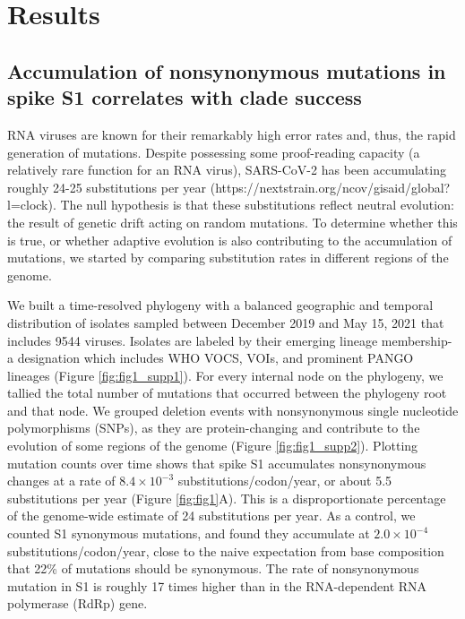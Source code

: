 \documentclass[11pt,oneside,letterpaper]{article}
\begin{document}
\section*{Results}
\subsection*{Accumulation of nonsynonymous mutations in spike S1 correlates with clade success}
RNA viruses are known for their remarkably high error rates and, thus, the rapid generation of mutations. Despite possessing some proof-reading capacity (a relatively rare function for an RNA virus), SARS-CoV-2 has been accumulating roughly 24-25 substitutions per year (https://nextstrain.org/ncov/gisaid/global?l=clock). The null hypothesis is that these substitutions reflect neutral evolution: the result of genetic drift acting on random mutations. To determine whether this is true, or whether adaptive evolution is also contributing to the accumulation of mutations, we started by comparing substitution rates in different regions of the genome.

We built a time-resolved phylogeny with a balanced geographic and temporal distribution of isolates sampled between December 2019 and May 15, 2021 that includes 9544 viruses. Isolates are labeled by their emerging lineage membership- a designation which includes WHO VOCS, VOIs, and prominent PANGO lineages (Figure \ref{fig:fig1_supp1}). For every internal node on the phylogeny, we tallied the total number of mutations that occurred between the phylogeny root and that node. We grouped deletion events with nonsynonymous single nucleotide polymorphisms (SNPs), as they are protein-changing and contribute to the evolution of some regions of the genome (Figure \ref{fig:fig1_supp2}). Plotting mutation counts over time shows that spike S1 accumulates nonsynonymous changes at a rate of $8.4 \times 10^{-3}$ substitutions/codon/year, or about 5.5 substitutions per year (Figure \ref{fig:fig1}A). This is a disproportionate percentage of the genome-wide estimate of 24 substitutions per year. As a control, we counted S1 synonymous mutations, and found they accumulate at $2.0 \times 10^{-4}$ substitutions/codon/year, close to the naive expectation from base composition that 22\% of mutations should be synonymous. The rate of nonsynonymous mutation in S1 is roughly 17 times higher than in the RNA-dependent RNA polymerase (RdRp) gene.
\end{document}
